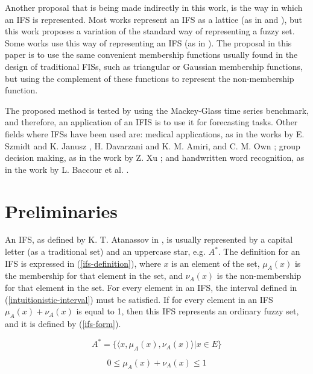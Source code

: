 \documentclass[conference]{IEEEtran}
\begin{document}
Another proposal that is being made indirectly in this work, is the
way in which an IFS is represented. Most works represent an IFS as a
lattice (as in \cite{deschrijver2004representation} and
\cite{despi2013generalised}), but this work proposes a variation of the
standard way of representing a fuzzy set. Some works use
this way of representing an IFS (as in
\cite{davarzani2013novel}). The proposal in this paper is to use the
same convenient membership functions usually found in the design of
traditional FISs, such as triangular or Gaussian membership functions,
but using the complement of these functions to represent the
non-membership function.

The proposed method is tested by using the Mackey-Glass time series
benchmark, and therefore, an application of an IFIS is to use it for
forecasting tasks. Other fields where IFSs have been used are: medical
applications, as in the works by E. Szmidt and K. Janusz
\cite{szmidt2001intuitionistic}, H. Davarzani and
K. M. Amiri\cite{davarzani2013novel}, and C. M. Own
\cite{own2009switching}; group decision making, as in the work by
Z. Xu \cite{xu2007intuitionistic}; and handwritten word recognition,
as in the work by L. Baccour et al. \cite{baccour2008application}.

\section{Preliminaries}
\label{preliminaries}

An IFS, as defined by K. T. Atanassov in
\cite{atanassov2013intuitionistic}, is usually represented by a
capital letter (as a traditional set) and an uppercase star,
e.g. $A^{*}$. The definition for an IFS is expressed in
(\ref{ifs-definition}), where $x$ is an element of the set,
$\mu_{A}(x)$ is the membership for that element in the set, and
$\nu_{A}(x)$ is the non-membership for that element in the set. For
every element in an IFS, the interval defined in
(\ref{intuitionistic-interval}) must be satisfied. If for every
element in an IFS $\mu_{A}(x) + \nu_{A}(x)$ is equal to 1, then this
IFS represents an ordinary fuzzy set, and it is defined by
(\ref{ifs-form}).

\begin{equation}
  \label{ifs-definition}
  A^{*} = \{\langle x, \mu _{A} (x), \nu _{A} (x) \rangle | x \in E\}
\end{equation}

\begin{equation}
  \label{intuitionistic-interval}
  0 \leq \mu_{A}(x) + \nu_{A}(x) \leq 1
\end{equation}
\end{document}
